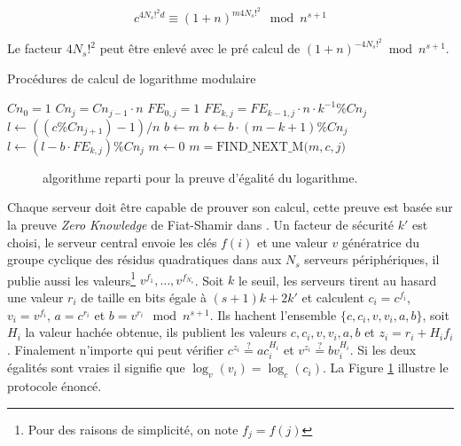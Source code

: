 			\begin{equation}c^{4N_s!^2d} \equiv (1+n)^{m4N_s!^2} \mod{n^{s+1}} \end{equation}

	Le facteur $4N_s!^2$ peut être enlevé avec le pré calcul de $(1+n)^{-4N_s!^2}\bmod{n^{s+1}}$. 

	\begin{algorithm}
		\caption{Procédures de calcul de logarithme modulaire}
		\label{algo:logm}
		\begin{algorithmic}[1]
				\State $Cn_0 = 1$
					\State $Cn_j = Cn_{j-1}\cdot n$
					\State $FE_{0,j} = 1$ 
						\State $FE_{k,j} = FE_{k-1,j}\cdot n \cdot k^{-1}\%Cn_{j}$ 
					\EndFor
				\EndFor
			\EndFunction
				\State $l\gets ((c\%Cn_{j+1})-1)/n$ 
				\State $b \gets m$
					\State $b \gets b\cdot(m-k+1) \% Cn_j$
					\State $l \gets (l- b\cdot FE_{k,j} )\% Cn_j$
				\EndFor
			\EndFunction
				\State $m \gets 0$
					\State $m = \text{FIND\_NEXT\_M($m,c,j$)}$
				\EndFor
			\EndFunction
		\end{algorithmic}
	\end{algorithm}
		\begin{figure}
			\center
			\caption{algorithme reparti pour la preuve d'égalité du logarithme.}
			
			\label{fig:rep}
		\end{figure}

	Chaque serveur doit être capable de prouver son calcul, cette preuve est basée sur la preuve \textit{Zero Knowledge} de Fiat-Shamir dans
	\cite{journals/joc/FeigeFS88}. Un facteur de sécurité $k'$ est choisi, le serveur central envoie les clés $f(i)$ et une 
	valeur $v$ gé\-né\-ra\-tri\-ce  du groupe cyclique des résidus quadratiques dans  aux $N_s$ 
	serveurs périphériques, il publie aussi les valeurs\footnote{Pour des raisons de simplicité, on note $f_j = f(j)$} 
	$v^{f_1}, \dots, v^{f_{N_s}}$. Soit $k$ le seuil, les serveurs tirent au hasard une 
	valeur $r_i$ de taille en bits égale à $(s+1)k+2k'$ et calculent $c_i = c^{f_i}$, $v_i = v^{f_i}$, $a = c^{r_i}$ et $b = v^{r_i}\mod{n^{s+1}}$. 
	Ils hachent l'ensemble $\{c,c_i,v,v_i,a,b\}$, soit $H_i$ la valeur hachée obtenue, ils publient les valeurs $c, c_i, v, v_i, a, b$ et 
	$z_i = r_i+H_if_i$. Finalement n'importe qui peut 
	vérifier $c^{z_i} \stackrel{?}{=}ac_i^{H_i}$ et $v^{z_i} \stackrel{?}{=}bv_i^{H_i}$. Si les deux égalités sont vraies il signifie 
	que $\log_{v}(v_i) = \log_{c}(c_i)$.
	La Figure \ref{fig:rep} illustre le protocole énoncé.

